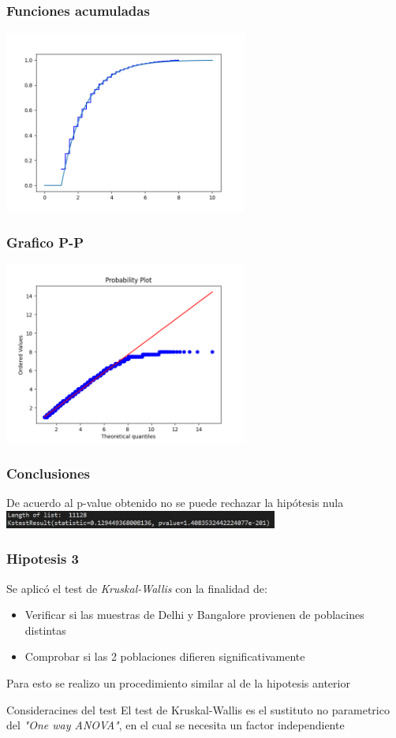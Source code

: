 \documentclass{beamer}
\begin{document}
\begin{frame}
  \frametitle{Funciones acumuladas}
  \includegraphics[width=8cm]{hip2/acumuladas.png}

\end{frame}

\begin{frame}
  \frametitle{Grafico P-P}
  \includegraphics[width=8cm]{hip2/grafico_pp.png}
\end{frame}

\begin{frame}
  \frametitle{Conclusiones}
  De acuerdo al p-value obtenido no se puede rechazar la hipótesis nula
  \includegraphics[width=9cm]{hip2/p-val.jpg}
\end{frame}

\begin{frame}
  \frametitle{Hipotesis 3}

  Se aplicó el test de \textit{Kruskal-Wallis} con la finalidad de:

  \begin{itemize}
      \item Verificar si las muestras de Delhi y Bangalore provienen de poblacines
        distintas
        \item Comprobar si las 2 poblaciones difieren significativamente
  \end{itemize}

  Para esto se realizo un procedimiento similar al de la hipotesis anterior

  \begin{alertblock}{Consideracines del test}
    El test de Kruskal-Wallis es el sustituto no parametrico del
    \textit{"One way ANOVA"}, en el cual se necesita un factor independiente
  \end{alertblock}
\end{frame}
\end{document}
